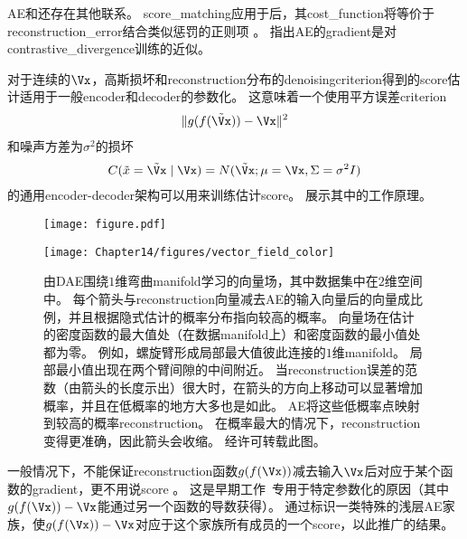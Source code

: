 \gls{AE}和还存在其他联系。
\gls{score_matching}应用于后，其\gls{cost_function}将等价于\gls{reconstruction_error}结合类似惩罚的正则项 \citep{Swersky-ICML2011}。
\citet{Bengio+Delalleau-2009}指出\gls{AE}的\gls{gradient}是对\gls{contrastive_divergence}训练的近似。


对于连续的$\Vx$，高斯损坏和\gls{reconstruction}分布的\gls{denoising}\gls{criterion}得到的\gls{score}估计适用于一般\gls{encoder}和\gls{decoder}的参数化\citep{Alain+Bengio-ICLR2013-small}。
这意味着一个使用平方误差\gls{criterion}
\begin{align}
 \| g(f(\tilde \Vx)) - \Vx \|^2
\end{align}
和噪声方差为$\sigma^2 $的损坏
\begin{align}
 C(\tilde x = \tilde \Vx \mid \Vx) = N(\tilde \Vx; \mu=\Vx, \Sigma = \sigma^2 I)
\end{align}
的通用\gls{encoder}-\gls{decoder}架构可以用来训练估计\gls{score}。
展示其中的工作原理。

\begin{figure}[!htb]
\ifOpenSource
\centerline{\texttt{[image: figure.pdf]}}
\else
\centerline{\texttt{[image: Chapter14/figures/vector\_field\_color]}}
\fi
\caption{由\gls{DAE}围绕$1$维弯曲\gls{manifold}学习的向量场，其中数据集中在$2$维空间中。
每个箭头与\gls{reconstruction}向量减去\gls{AE}的输入向量后的向量成比例，并且根据隐式估计的概率分布指向较高的概率。
向量场在估计的密度函数的最大值处（在数据\gls{manifold}上）和密度函数的最小值处都为零。
例如，螺旋臂形成局部最大值彼此连接的$1$维\gls{manifold}。
局部最小值出现在两个臂间隙的中间附近。
当\gls{reconstruction}误差的范数（由箭头的长度示出）很大时，在箭头的方向上移动可以显著增加概率，并且在低概率的地方大多也是如此。
\gls{AE}将这些低概率点映射到较高的概率\gls{reconstruction}。
在概率最大的情况下，\gls{reconstruction}变得更准确，因此箭头会收缩。
经\citet{Alain+Bengio-ICLR2013-small}许可转载此图。
}
\label{fig:chap14_vector_field_color}
\end{figure}

一般情况下，不能保证\gls{reconstruction}函数$g(f(\Vx))$减去输入$\Vx$后对应于某个函数的\gls{gradient}，更不用说\gls{score} 。
这是早期工作~\citep{Vincent-NC-2011-small}专用于特定参数化的原因（其中$g(f(\Vx)) - \Vx$能通过另一个函数的导数获得）。
\citet{Kamyshanska+Memisevic-2015}通过标识一类特殊的浅层\gls{AE}家族，使$g(f(\Vx)) - \Vx$对应于这个家族所有成员的一个\gls{score}，以此推广\citet{Vincent-NC-2011-small}的结果。

